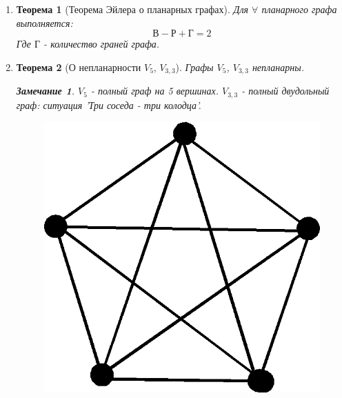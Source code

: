 \documentclass[a4paper,12pt]{article}
\newtheorem{theorem}{Теорема}
\newtheorem{notice}{Замечание}
\begin{document}
\begin{enumerate}
            \item 
                \begin{theorem}[Теорема Эйлера о планарных графах]
                    Для $\forall$ планарного графа выполняется:
                    $$
                    В - Р + Г = 2
                    $$
                    Где $Г$ - количество граней графа.
                \end{theorem}
            \item 
                \begin{theorem}[О непланарности $V_5$, $V_{3, 3}$]
                    Графы $V_5$, $V_{3, 3}$ непланарны.
                    \begin{notice}
                    $V_5$ - полный граф на 5 вершинах. $V_{3, 3}$ - полный двудольный граф: ситуация 'Три соседа - три колодца'.
                    \end{notice}
                \end{theorem}
                \begin{figure}[ht]
                    \centering
                    \includegraphics[scale=0.3]{ex71.png}

\end{figure}
\end{enumerate}
\end{document}
